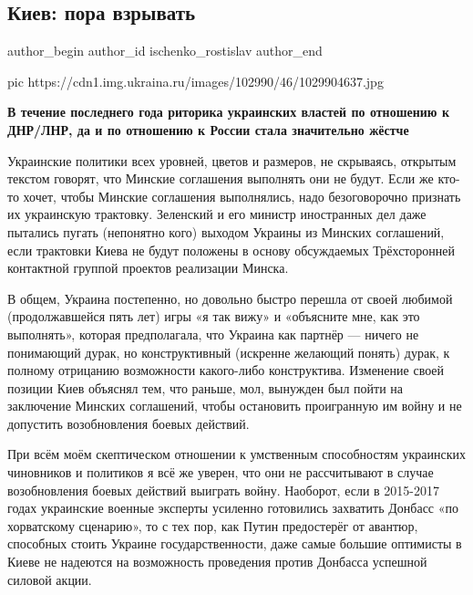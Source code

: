  
 
 
 
 
 
\subsection{Киев: пора взрывать}
\label{sec:09_12_2020.news.ru.ukraina_ru.ischenko_rostislav.1.kiev_pora_vzryvat}
\ifcmt
	author_begin
   author_id ischenko_rostislav
	author_end
\fi

\ifcmt
pic https://cdn1.img.ukraina.ru/images/102990/46/1029904637.jpg
\fi

\begin{leftbar}
	\bfseries
В течение последнего года риторика украинских властей по отношению к ДНР/ЛНР,
да и по отношению к России стала значительно жёстче
\end{leftbar}

Украинские политики всех уровней, цветов и размеров, не скрываясь, открытым
текстом говорят, что Минские соглашения выполнять они не будут. Если же кто-то
хочет, чтобы Минские соглашения выполнялись, надо безоговорочно признать их
украинскую трактовку. Зеленский и его министр иностранных дел даже пытались
пугать (непонятно кого) выходом Украины из Минских соглашений, если трактовки
Киева не будут положены в основу обсуждаемых Трёхсторонней контактной группой
проектов реализации Минска.

В общем, Украина постепенно, но довольно быстро перешла от своей любимой
(продолжавшейся пять лет) игры «я так вижу» и «объясните мне, как это
выполнять», которая предполагала, что Украина как партнёр — ничего не
понимающий дурак, но конструктивный (искренне желающий понять) дурак, к полному
отрицанию возможности какого-либо конструктива. Изменение своей позиции Киев
объяснял тем, что раньше, мол, вынужден был пойти на заключение Минских
соглашений, чтобы остановить проигранную им войну и не допустить возобновления
боевых действий.

При всём моём скептическом отношении к умственным способностям украинских
чиновников и политиков я всё же уверен, что они не рассчитывают в случае
возобновления боевых действий выиграть войну. Наоборот, если в 2015-2017 годах
украинские военные эксперты усиленно готовились захватить Донбасс «по
хорватскому сценарию», то с тех пор, как Путин предостерёг от авантюр,
способных стоить Украине государственности, даже самые большие оптимисты в
Киеве не надеются на возможность проведения против Донбасса успешной силовой
акции.

